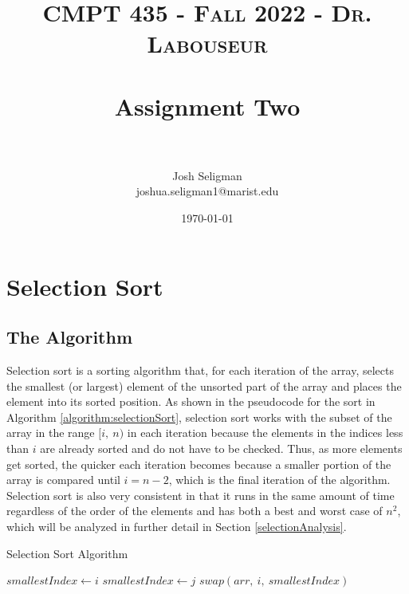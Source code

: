 \documentclass[letterpaper, 10pt,DIV=13]{scrartcl}
\title{	
   \normalfont \normalsize 
   \textsc{CMPT 435 - Fall 2022 - Dr. Labouseur} \\[10pt] %
   \horrule{0.5pt} \\[0.25cm] 	%
   \huge Assignment Two  \\     	    %
   \horrule{0.5pt} \\[0.25cm] 	%
}
\author{Josh Seligman \\ \normalsize joshua.seligman1@marist.edu}
\date{\normalsize\today} 	%
\numberwithin{equation}{section} %
\numberwithin{figure}{section} %
\numberwithin{table}{section} %
\begin{document}
\maketitle %

\section{Selection Sort}\label{selectionSortSection}
\subsection{The Algorithm}
Selection sort is a sorting algorithm that, for each iteration of the array, selects the smallest (or largest) element of the unsorted part of the array and places the element into its sorted position. As shown in the pseudocode for the sort in Algorithm \ref{algorithm:selectionSort}, selection sort works with the subset of the array in the range $[i,~n)$ in each iteration because the elements in the indices less than $i$ are already sorted and do not have to be checked. Thus, as more elements get sorted, the quicker each iteration becomes because a smaller portion of the array is compared until $i = n - 2$, which is the final iteration of the algorithm. Selection sort is also very consistent in that it runs in the same amount of time regardless of the order of the elements and has both a best and worst case of $n^2$, which will be analyzed in further detail in Section \ref{selectionAnalysis}.

\begin{algorithm}
  \caption{Selection Sort Algorithm}
  \label{algorithm:selectionSort}
  \begin{algorithmic}[1]
         
          \State $smallestIndex \gets i$
           
              \State $smallestIndex \gets j$ 
            \EndIf
          \EndFor
          \State $swap(arr,~i,~smallestIndex)$ 
        \EndFor
      \EndProcedure
  \end{algorithmic}
\end{algorithm}
\end{document}
